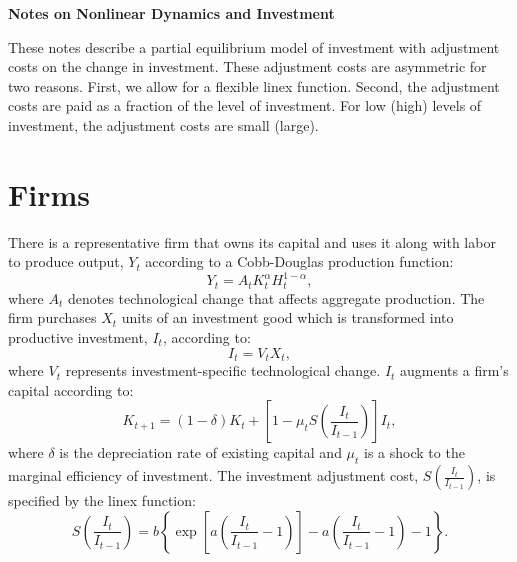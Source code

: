 \documentclass[11pt,fleqn]{article}
\begin{document}
\doublespacing

\begin{center}
\textbf{\Large Notes on Nonlinear Dynamics and Investment}
\end{center}

These notes describe a partial equilibrium model of investment with adjustment costs on the change in investment.  These adjustment costs are asymmetric for two reasons.  First, we allow for a flexible linex function.  Second, the adjustment costs are paid as a fraction of the level of investment.  For low (high) levels of investment, the adjustment costs are small (large). 

\section{Firms}

There is a representative firm that owns its capital and uses it along with labor to produce output, $Y_t$ according to a Cobb-Douglas production function:
\begin{equation}
Y_t = A_t K^{\alpha}_t H^{1-\alpha}_t,  \label{production_function}
\end{equation}
where $A_t$ denotes technological change that affects aggregate production.
The firm purchases $X_t$ units of an investment good which is transformed into productive investment, $I_t$, according to:
\begin{equation}
I_t = V_t X_t, \label{inv_production}
\end{equation}
where $V_t$ represents investment-specific technological change. $I_t$ augments a firm's capital according to:
\begin{equation} 
K_{t+1} = (1-\delta) K_t +\left[1- \mu_t S\left(\frac{I_t}{I_{t-1}}\right) \right] I_t,  \label{capital_accumulation}
\end{equation}
where $\delta$ is the depreciation rate of existing capital and $\mu_t$ is a shock to the marginal efficiency of investment.  The investment adjustment cost, $S\left(\frac{I_t}{I_{t-1}}\right)$, is specified by the linex function:
\begin{equation}
S\left(\frac{I_t}{I_{t-1}}\right) =  b \left\{\exp\left[ a \left(\frac{I_t}{I_{t-1}}-1\right)\right]-a\left(\frac{I_t}{I_{t-1}}-1\right)-1\right\}.
\end{equation}
\end{document}
